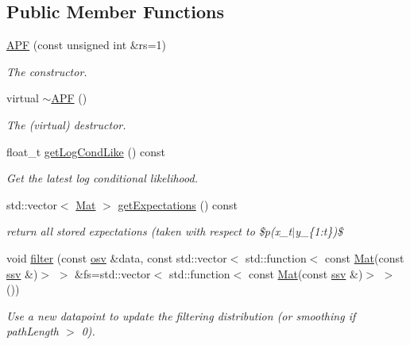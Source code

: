 \subsection*{Public Member Functions}
\begin{DoxyCompactItemize}
\item 
\hyperlink{classAPF_ac91086b73cfa01568ce80bbf616c6a91}{A\+PF} (const unsigned int \&rs=1)
\begin{DoxyCompactList}\small\item\em The constructor. \end{DoxyCompactList}\item 
\mbox{\label{classAPF_a8fce6bb760341c52ea49d4f9d1e7a529}} 
virtual \hyperlink{classAPF_a8fce6bb760341c52ea49d4f9d1e7a529}{$\sim$\+A\+PF} ()
\begin{DoxyCompactList}\small\item\em The (virtual) destructor. \end{DoxyCompactList}\item 
float\+\_\+t \hyperlink{classAPF_a9f8b62053470fcd2b7541dc3b60dff63}{get\+Log\+Cond\+Like} () const
\begin{DoxyCompactList}\small\item\em Get the latest log conditional likelihood. \end{DoxyCompactList}\item 
std\+::vector$<$ \hyperlink{classAPF_ac241705f732b7e0a0bc1a3bc518a92d2}{Mat} $>$ \hyperlink{classAPF_ab531233df84dcae5bc93178d19495480}{get\+Expectations} () const
\begin{DoxyCompactList}\small\item\em return all stored expectations (taken with respect to \$p(x\+\_\+t$\vert$y\+\_\+\{1\+:t\})\$ \end{DoxyCompactList}\item 
void \hyperlink{classAPF_a7fab332be59a652efc6a6546711d2ff9}{filter} (const \hyperlink{classAPF_ae4887b3f7121a7509397dd00bffedfe0}{osv} \&data, const std\+::vector$<$ std\+::function$<$ const \hyperlink{classAPF_ac241705f732b7e0a0bc1a3bc518a92d2}{Mat}(const \hyperlink{classAPF_a8b170471292cd6fb5c3c19b55b42fc4e}{ssv} \&)$>$ $>$ \&fs=std\+::vector$<$ std\+::function$<$ const \hyperlink{classAPF_ac241705f732b7e0a0bc1a3bc518a92d2}{Mat}(const \hyperlink{classAPF_a8b170471292cd6fb5c3c19b55b42fc4e}{ssv} \&)$>$ $>$())
\begin{DoxyCompactList}\small\item\em Use a new datapoint to update the filtering distribution (or smoothing if path\+Length $>$ 0). \end{DoxyCompactList}\item 

\end{DoxyCompactItemize}

